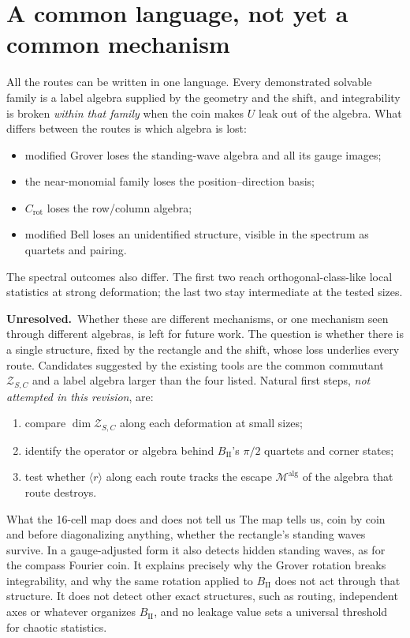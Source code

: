 \documentclass[11pt,a4paper,oneside]{report}
\newcommand{\open}{\textbf{Unresolved.}\ }
\numberwithin{equation}{chapter}
\begin{document}
\section{A common language, not yet a common mechanism}

All the routes can be written in one language. Every demonstrated
solvable family is a label algebra supplied by the geometry and the
shift, and integrability is broken \emph{within that family} when the
coin makes \(U\) leak out of the algebra. What differs between the
routes is which algebra is lost:
\begin{itemize}
\item modified Grover loses the standing-wave algebra and all its gauge
images;
\item the near-monomial family loses the position--direction basis;
\item \(C_{\mathrm{rot}}\) loses the row/column algebra;
\item modified Bell loses an unidentified structure, visible in the
spectrum as quartets and pairing.
\end{itemize}
The spectral outcomes also differ. The first two reach
orthogonal-class-like local statistics at strong deformation; the last
two stay intermediate at the tested sizes.

\open Whether these are different mechanisms, or one mechanism seen
through different algebras, is left for future work. The question is
whether there is a single structure, fixed by the rectangle and the
shift, whose loss underlies every route. Candidates suggested by the
existing tools are the common commutant \(\mathcal Z_{S,C}\) and a label
algebra larger than the four listed. Natural first steps, \emph{not
attempted in this revision}, are:
\begin{enumerate}
\item compare \(\dim\mathcal Z_{S,C}\) along each deformation at small
sizes;
\item identify the operator or algebra behind \(B_{\mathrm{II}}\)'s
\(\pi/2\) quartets and corner states;
\item test whether \(\langle r\rangle\) along each route tracks the
escape \(\mathcal M^{\mathrm{alg}}\) of the algebra that route destroys.
\end{enumerate}

\begin{lesson}{What the 16-cell map does and does not tell us}
The map tells us, coin by coin and before diagonalizing anything,
whether the rectangle's standing waves survive. In a gauge-adjusted form
it also detects hidden standing waves, as for the compass Fourier coin.
It explains precisely why the Grover rotation breaks integrability, and
why the same rotation applied to \(B_{\mathrm{II}}\) does not act through
that structure. It does not detect other exact structures, such as
routing, independent axes or whatever organizes \(B_{\mathrm{II}}\), and
no leakage value sets a universal threshold for chaotic statistics.
\end{lesson}
\end{document}
